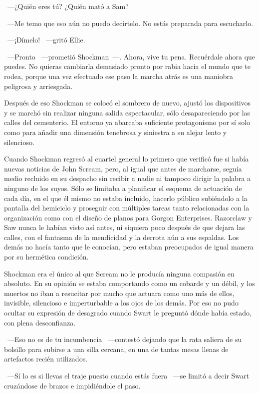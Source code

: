 ~---¿Quién eres tú? ¿Quién mató a Sam?

~---Me temo que eso aún no puedo decírtelo. No estás preparada para escucharlo.

~---¡Dímelo! ~---gritó Ellie.

~---Pronto ~---prometió Shockman~---. Ahora, vive tu pena. Recuérdale ahora que puedes. No quieras cambiarla demasiado pronto por rabia hacia el mundo que te rodea, porque una vez efectuado ese paso la marcha atrás es una maniobra peligrosa y arriesgada.

Después de eso Shockman se colocó el sombrero de nuevo, ajustó los dispositivos y se marchó sin realizar ninguna salida espectacular, sólo desapareciendo por las calles del cementerio. El entorno ya abarcaba suficiente protagonismo por sí solo como para añadir una dimensión tenebrosa y siniestra a su alejar lento y silencioso.

\parbreak
Cuando Shockman regresó al cuartel general lo primero que verificó fue si había nuevas noticias de John Scream, pero, al igual que antes de marcharse, seguía medio recluido en su despacho sin recibir a nadie ni tampoco dirigir la palabra a ninguno de los suyos. Sólo se limitaba a planificar el esquema de actuación de cada día, en el que él mismo no estaba incluido, hacerlo público subiéndolo a la pantalla del hemiciclo y proseguir con múltiples tareas tanto relacionadas con la organización como con el diseño de planos para Gorgon Enterprises. Razorclaw y Saw nunca le habían visto así antes, ni siquiera poco después de que dejara las calles, con el fantasma de la mendicidad y la derrota aún a sus espaldas. Los demás no hacía tanto que le conocían, pero estaban preocupados de igual manera por su hermética condición.

Shockman era el único al que Scream no le producía ninguna compasión en absoluto. En su opinión se estaba comportando como un cobarde y un débil, y los muertos no iban a resucitar por mucho que actuara como uno más de ellos, invisible, silencioso e imperturbable a los ojos de los demás. Por eso no pudo ocultar su expresión de desagrado cuando Swart le preguntó dónde había estado, con plena desconfianza.

~---Eso no es de tu incumbencia ~---contestó dejando que la rata saliera de su bolsillo para subirse a una silla cercana, en una de tantas mesas llenas de artefactos recién utilizados.

~---Sí lo es si llevas el traje puesto cuando estás fuera ~---se limitó a decir Swart cruzándose de brazos e impidiéndole el paso.

